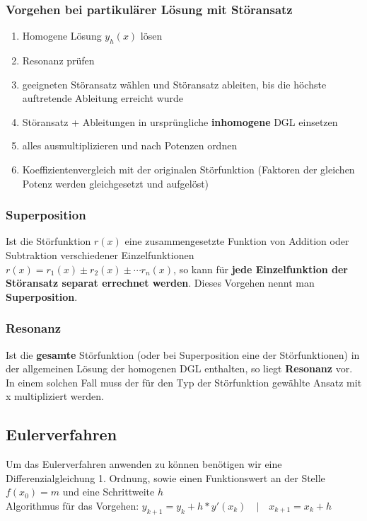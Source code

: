\documentclass[12pt, a4paper]{scrreprt}
\begin{document}
\subsubsection{Vorgehen bei partikulärer Lösung mit Störansatz}

\begin{enumerate}
\item Homogene Lösung \(y_h(x)\) lösen
\item Resonanz prüfen
\item geeigneten Störansatz wählen und Störansatz ableiten, bis die höchste auftretende Ableitung erreicht wurde
\item Störansatz + Ableitungen in ursprüngliche \textbf{inhomogene} DGL einsetzen
\item alles ausmultiplizieren und nach Potenzen ordnen
\item Koeffizientenvergleich mit der \glqq{} originalen \grqq{} Störfunktion (Faktoren der gleichen Potenz werden gleichgesetzt und aufgelöst)
\end{enumerate}

\subsubsection{Superposition}

Ist die Störfunktion \(r(x)\) eine zusammengesetzte Funktion von Addition oder Subtraktion verschiedener Einzelfunktionen \(r(x)=r_1(x)\pm r_2(x)\pm \cdots r_n(x)\), so kann für \textbf{jede Einzelfunktion der Störansatz separat errechnet werden}. Dieses Vorgehen nennt man \textbf{Superposition}.

\subsubsection{Resonanz}

Ist die \textbf{gesamte} Störfunktion (oder bei Superposition eine der Störfunktionen) in der allgemeinen Lösung der homogenen DGL enthalten, so liegt \textbf{Resonanz} vor.\\
In einem solchen Fall muss der für den Typ der Störfunktion gewählte Ansatz mit x multipliziert werden.

\subsection{Eulerverfahren}

Um das Eulerverfahren anwenden zu können benötigen wir eine Differenzialgleichung 1. Ordnung, sowie einen Funktionswert an der Stelle \(f(x_0) = m\) und eine Schrittweite \(h\)\\[1em]
Algorithmus für das Vorgehen: \(y_{k+1} = y_k + h * y'(x_k) \quad | \quad x_{k+1} = x_k + h\)
\end{document}
